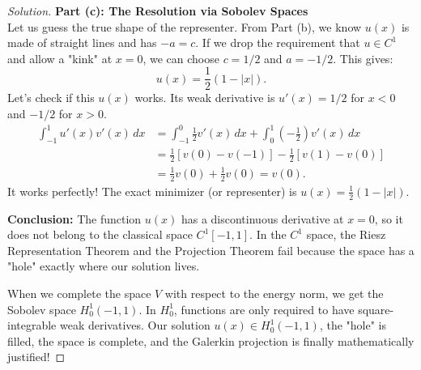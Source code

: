 \documentclass{article}
\begin{document}
\begin{proof}[Solution]
    \vspace{1em}
    \textbf{Part (c): The Resolution via Sobolev Spaces} \\
    Let us guess the true shape of the representer. From Part (b), we know $u(x)$ is made of straight lines and has $-a = c$. If we drop the requirement that $u \in C^1$ and allow a "kink" at $x=0$, we can choose $c = 1/2$ and $a = -1/2$. This gives:
    \[ u(x) = \frac{1}{2}(1 - |x|). \]
    Let's check if this $u(x)$ works. Its weak derivative is $u'(x) = 1/2$ for $x<0$ and $-1/2$ for $x>0$.
    \begin{align*}
        \int_{-1}^1 u'(x) v'(x) \, dx &= \int_{-1}^0 \frac{1}{2} v'(x) \, dx + \int_0^1 \left(-\frac{1}{2}\right) v'(x) \, dx \\
        &= \frac{1}{2}[v(0) - v(-1)] - \frac{1}{2}[v(1) - v(0)] \\
        &= \frac{1}{2}v(0) + \frac{1}{2}v(0) = v(0).
    \end{align*}
    It works perfectly! The exact minimizer (or representer) is $u(x) = \frac{1}{2}(1 - |x|)$.
    
    \noindent \textbf{Conclusion:} 
    The function $u(x)$ has a discontinuous derivative at $x=0$, so it does not belong to the classical space $C^1[-1, 1]$. In the $C^1$ space, the Riesz Representation Theorem and the Projection Theorem fail because the space has a "hole" exactly where our solution lives. 
    
    When we complete the space $V$ with respect to the energy norm, we get the Sobolev space $H_0^1(-1, 1)$. In $H_0^1$, functions are only required to have square-integrable weak derivatives. Our solution $u(x) \in H_0^1(-1, 1)$, the "hole" is filled, the space is complete, and the Galerkin projection is finally mathematically justified!
\end{proof}
\end{document}
